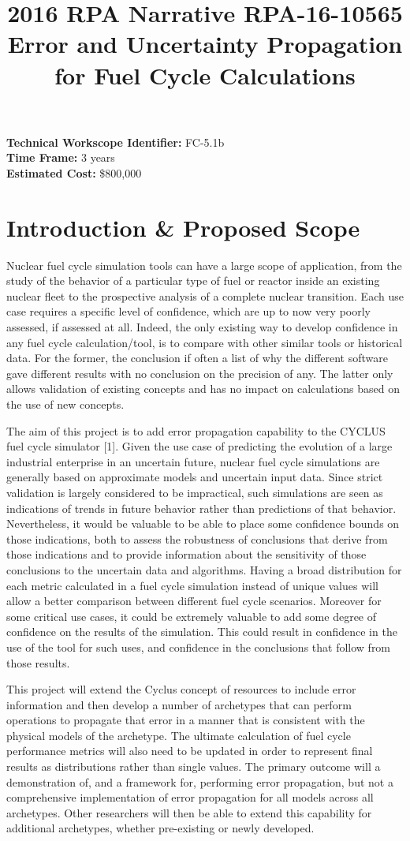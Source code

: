 \documentclass[dvips,12pt]{article}
\title{2016 RPA Narrative RPA-16-10565\\
Error and Uncertainty Propagation for Fuel Cycle Calculations}
\begin{document}
\noindent\textbf{Technical Workscope Identifier:} FC-5.1b\\
\textbf{Time Frame:} 3 years\\
\textbf{Estimated Cost:} \$800,000


\section{Introduction \& Proposed Scope}
Nuclear fuel cycle simulation tools can have a large
scope of application, from the study of the
behavior of a particular type of fuel or reactor inside an
existing nuclear fleet to the prospective analysis
of a complete nuclear transition. 
Each use case
requires a specific level
of confidence, which are up to now very
poorly assessed, if assessed at all.
Indeed, the only existing way to develop confidence in
any fuel cycle calculation/tool, is to compare
with other similar tools or historical
data.  For the former, the conclusion if often 
a list of why the different software gave
different results with no conclusion on the
precision of any.  The latter only allows
validation of existing concepts and has no impact
on calculations based on the use of new
concepts.

The aim of this project is to add error
propagation capability to the CYCLUS fuel cycle
simulator [1]. Given the use case of predicting the
evolution of a large industrial enterprise in an
uncertain future, nuclear fuel cycle simulations
are generally based on approximate models and
uncertain input data.  Since strict validation is largely
considered to be impractical, such simulations are
seen as indications of trends in future behavior rather than
predictions of that behavior. Nevertheless, it
would be valuable to be able to place some
confidence bounds on those indications, both to
assess the robustness of conclusions that derive
from those indications and to provide information
about the sensitivity of those conclusions to the
uncertain data and algorithms.  Having a broad
distribution for each metric calculated in a fuel
cycle simulation instead of unique values will
allow a better comparison between different fuel
cycle scenarios.  Moreover for some critical
use cases, it could be extremely valuable to add
some degree of confidence on the results of the simulation.
This could result in confidence in the use of the tool for
such uses, and confidence in the conclusions that follow
from those results.

This project
will extend the Cyclus concept of resources to
include error information and then develop a
number of archetypes that can perform operations
to propagate that error in a manner that is 
consistent with the physical models of the 
archetype.
The ultimate calculation of fuel cycle performance
metrics will also need to be updated in order to
represent final results as distributions rather
than single values.  The primary outcome will
a demonstration of, and a
framework for, performing error propagation,
but not a comprehensive implementation of error
propagation for all models across all archetypes.
Other researchers will then be able to extend
this capability for additional archetypes, 
whether pre-existing or newly developed.
\end{document}
